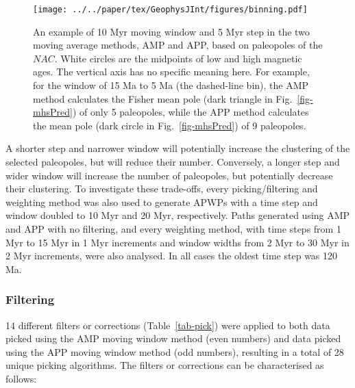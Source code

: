 \begin{figure}[!ht]
  \centering
  \texttt{[image: ../../paper/tex/GeophysJInt/figures/binning.pdf]}
  \caption[How moving average methods work]{An example of 10 Myr moving window
    and 5 Myr step in the two moving average methods, AMP and APP, based on
    paleopoles of the $NAC$. White circles are the midpoints of low and high
    magnetic ages. The vertical axis has no specific meaning here. For example,
    for the window of 15 Ma to 5 Ma (the dashed-line bin), the AMP method
    calculates the Fisher mean pole (dark triangle in Fig.~\ref{fig-mhsPred}) of
    only 5 paleopoles, while the APP method calculates the mean pole (dark
    circle in Fig.~\ref{fig-mhsPred}) of 9 paleopoles.}\label{fig-nac-maplat}
\end{figure}

A shorter step and narrower window will potentially increase the clustering of
the selected paleopoles, but will reduce their number. Conversely, a longer step
and wider window will increase the number of paleopoles, but potentially
decrease their clustering. To investigate these trade-offs, every
picking/filtering and weighting method was also used to generate APWPs with a
time step and window doubled to 10 Myr and 20 Myr, respectively. Paths generated
using AMP and APP with no filtering, and every weighting method, with time steps
from 1 Myr to 15 Myr in 1 Myr increments and window widths from 2 Myr to 30 Myr
in 2 Myr increments, were also analysed. In all cases the oldest time step was
120 Ma.

\subsubsection{Filtering}\label{sec:f}

14 different filters or corrections (Table~\ref{tab-pick}) were applied to both
data picked using the AMP moving window method (even numbers) and data picked
using the APP moving window method (odd numbers), resulting in a total of 28
unique picking algorithms. The filters or corrections can be characterised as
follows:

